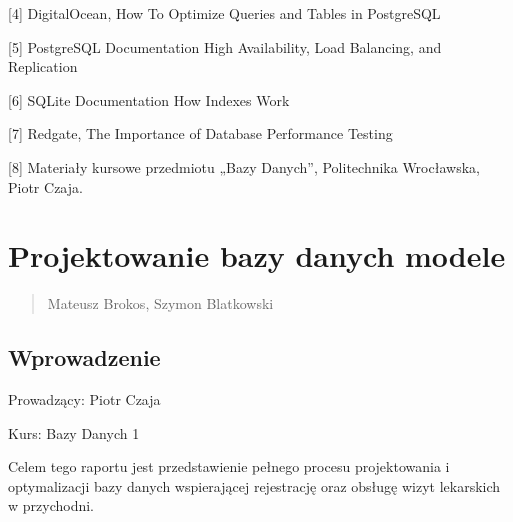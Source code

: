 \documentclass[a4paper,11pt,openany,english]{sphinxmanual}
\begin{document}
\sphinxAtStartPar
{[}4{]} DigitalOcean, How To Optimize Queries and Tables in PostgreSQL

\sphinxAtStartPar
{[}5{]} PostgreSQL Documentation \textendash{} High Availability, Load Balancing, and Replication

\sphinxAtStartPar
{[}6{]} SQLite Documentation \textendash{} How Indexes Work

\sphinxAtStartPar
{[}7{]} Redgate, The Importance of Database Performance Testing

\sphinxAtStartPar
{[}8{]} Materiały kursowe przedmiotu „Bazy Danych”, Politechnika Wrocławska, Piotr Czaja.

\sphinxstepscope


\chapter{Projektowanie bazy danych \sphinxhyphen{} modele}
\label{\detokenize{rozdzial3/index:projektowanie-bazy-danych-modele}}\label{\detokenize{rozdzial3/index::doc}}\begin{quote}\begin{description}
\sphinxAtStartPar
Mateusz Brokos, Szymon Blatkowski

\end{description}\end{quote}


\section{Wprowadzenie}
\label{\detokenize{rozdzial3/index:wprowadzenie}}
\sphinxAtStartPar
Prowadzący: Piotr Czaja

\sphinxAtStartPar
Kurs: Bazy Danych 1

\sphinxAtStartPar
Celem tego raportu jest przedstawienie pełnego procesu projektowania i optymalizacji bazy danych wspierającej rejestrację oraz obsługę wizyt lekarskich w przychodni.
\end{document}
